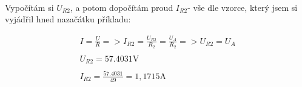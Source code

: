 \\
\begin{center}
Vypočítám si $U_{R2}$, a potom dopočítám proud $I_{R2}$- vše dle vzorce, který jsem si vyjádřil hned nazačátku příkladu:
\end{center}
\begin{gather*}
I = \frac{U}{R} =>I_{R2} = \frac{U_{R2}}{R_2} = \frac{U_A}{R_2} => U_{R2} = U_A\\
\\
U_{R2} = 57.4031 \text{V}\\
\\
I_{R2} = \frac{57.4031}{49} = 1,1715 \text{A}\\
\end{gather*}